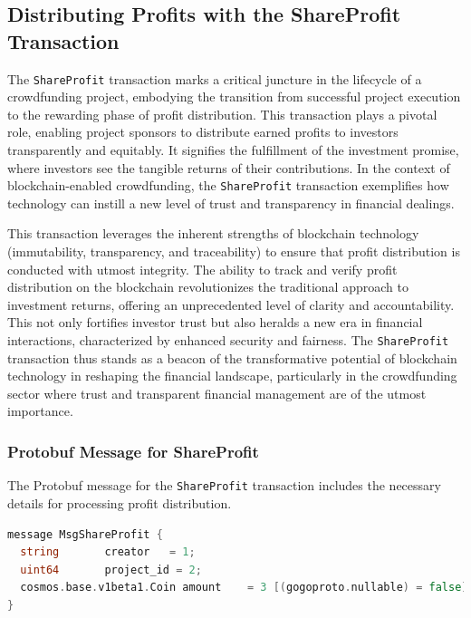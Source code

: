 \subsection{Distributing Profits with the ShareProfit Transaction}

The \texttt{ShareProfit} transaction marks a critical juncture in the lifecycle of a crowdfunding project, embodying the transition from successful project execution to the rewarding phase of profit distribution. This transaction plays a pivotal role, enabling project sponsors to distribute earned profits to investors transparently and equitably. It signifies the fulfillment of the investment promise, where investors see the tangible returns of their contributions. In the context of blockchain-enabled crowdfunding, the \texttt{ShareProfit} transaction exemplifies how technology can instill a new level of trust and transparency in financial dealings.

This transaction leverages the inherent strengths of blockchain technology (immutability, transparency, and traceability) to ensure that profit distribution is conducted with utmost integrity. The ability to track and verify profit distribution on the blockchain revolutionizes the traditional approach to investment returns, offering an unprecedented level of clarity and accountability. This not only fortifies investor trust but also heralds a new era in financial interactions, characterized by enhanced security and fairness. The \texttt{ShareProfit} transaction thus stands as a beacon of the transformative potential of blockchain technology in reshaping the financial landscape, particularly in the crowdfunding sector where trust and transparent financial management are of the utmost importance.

\subsubsection{Protobuf Message for ShareProfit}

The Protobuf message for the \texttt{ShareProfit} transaction includes the necessary details for processing profit distribution.

\begin{lstlisting}[language=go, caption=ShareProfit protobuf definition, label={lst:share_profit_proto}]
message MsgShareProfit {
  string       creator   = 1;
  uint64       project_id = 2;
  cosmos.base.v1beta1.Coin amount    = 3 [(gogoproto.nullable) = false];
}
\end{lstlisting}

